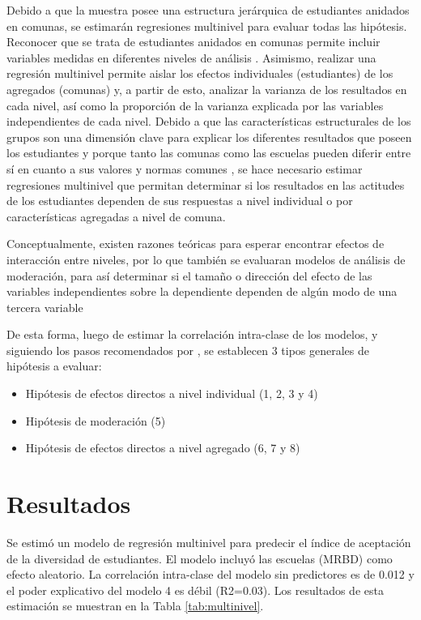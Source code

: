 \documentclass[12pt,twoside]{templates/facsothesis}
\begin{document}
Debido a que la muestra posee una estructura jerárquica de estudiantes anidados en comunas, se estimarán regresiones multinivel para evaluar todas las hipótesis. Reconocer que se trata de estudiantes anidados en comunas permite incluir variables medidas en diferentes niveles de análisis \citep{aguinis_BestPractice_2013}. Asimismo, realizar una regresión multinivel permite aislar los efectos individuales (estudiantes) de los agregados (comunas) y, a partir de esto, analizar la varianza de los resultados en cada nivel, así como la proporción de la varianza explicada por las variables independientes de cada nivel. Debido a que las características estructurales de los grupos son una dimensión clave para explicar los diferentes resultados que poseen los estudiantes \citep{trevino_Influence_2018} y porque tanto las comunas como las escuelas pueden diferir entre sí en cuanto a sus valores y normas comunes \citep{bayramozdemir_How_2020}, se hace necesario estimar regresiones multinivel que permitan determinar si los resultados en las actitudes de los estudiantes dependen de sus respuestas a nivel individual o por características agregadas a nivel de comuna.

Conceptualmente, existen razones teóricas para esperar encontrar efectos de interacción entre niveles, por lo que también se evaluaran modelos de análisis de moderación, para así determinar si el tamaño o dirección del efecto de las variables independientes sobre la dependiente dependen de algún modo de una tercera variable \citep{hayes_introduction_2022}

De esta forma, luego de estimar la correlación intra-clase de los modelos, y siguiendo los pasos recomendados por \citet{aguinis_BestPractice_2013}, se establecen 3 tipos generales de hipótesis a evaluar:

\begin{itemize}
\item
  Hipótesis de efectos directos a nivel individual (1, 2, 3 y 4)
\item
  Hipótesis de moderación (5)
\item
  Hipótesis de efectos directos a nivel agregado (6, 7 y 8)
\end{itemize}

\hypertarget{resultados}{%
\chapter{Resultados}\label{resultados}}

Se estimó un modelo de regresión multinivel para predecir el índice de aceptación de la diversidad de estudiantes. El modelo incluyó las escuelas (MRBD) como efecto aleatorio. La correlación intra-clase del modelo sin predictores es de 0.012 y el poder explicativo del modelo 4 es débil (R2=0.03). Los resultados de esta estimación se muestran en la Tabla \ref{tab:multinivel}.
\end{document}
